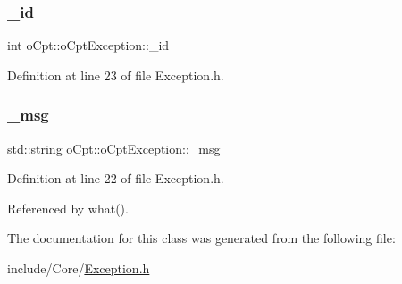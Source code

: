 \subsubsection{\texorpdfstring{\+\_\+id}{\_id}}
{\footnotesize\ttfamily int o\+Cpt\+::o\+Cpt\+Exception\+::\+\_\+id\hspace{0.3cm}{\ttfamily [private]}}



Definition at line 23 of file Exception.\+h.

\hypertarget{classo_cpt_1_1o_cpt_exception_a7d20b46357532fcde0c6f4614c636786}{}\label{classo_cpt_1_1o_cpt_exception_a7d20b46357532fcde0c6f4614c636786} 
\subsubsection{\texorpdfstring{\+\_\+msg}{\_msg}}
{\footnotesize\ttfamily std\+::string o\+Cpt\+::o\+Cpt\+Exception\+::\+\_\+msg\hspace{0.3cm}{\ttfamily [private]}}



Definition at line 22 of file Exception.\+h.



Referenced by what().



The documentation for this class was generated from the following file\+:\begin{DoxyCompactItemize}
\item 
include/\+Core/\hyperlink{_exception_8h}{Exception.\+h}\end{DoxyCompactItemize}
